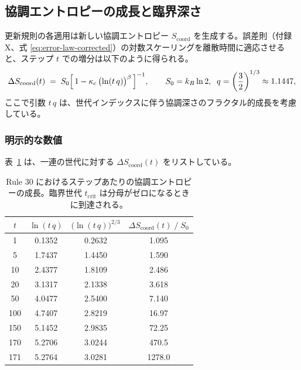 \documentclass[11pt,a4paper]{article}
\begin{document}
	\subsection{協調エントロピーの成長と臨界深さ}
	\label{subsec:entropy-growth}
	
	更新規則の各適用は新しい協調エントロピー \(S_{\mathrm{coord}}\) を生成する。誤差則（付録 X、式 \eqref{eq:error-law-corrected}）の対数スケーリングを離散時間に適応させると、ステップ \(t\) での増分は以下のように得られる。
	\begin{equation}
		\Delta S_{\mathrm{coord}}(t) \;=\;
		S_{0}\Bigl[\,1 - \kappa_c\,\bigl(\ln(t\,q)\bigr)^{\beta}\,\Bigr]^{-1},
		\qquad
		S_{0}=k_{B}\ln 2,\;\;
		q = \left(\frac{3}{2}\right)^{1/3}\approx 1.1447,
		\label{eq:deltaS}
	\end{equation}
	ここで引数 \(t\,q\) は、世代インデックスに伴う協調深さのフラクタル的成長を考慮している。
	
	\subsubsection*{明示的な数値}
	表~\ref{tab:entropy} は、一連の世代に対する \(\Delta S_{\mathrm{coord}}(t)\) をリストしている。
	
	\begin{table}[H]
		\centering
		\caption{Rule 30 におけるステップあたりの協調エントロピーの成長。臨界世代 \(t_{\mathrm{crit}}\) は分母がゼロになるときに到達される。}
		\label{tab:entropy}
		\small
		\begin{tabular}{c c c c}
			\toprule
			\(t\) & \(\ln(t\,q)\) & \(\bigl(\ln(t\,q)\bigr)^{2/3}\) &
			\(\Delta S_{\mathrm{coord}}(t)\;/\;S_{0}\) \\
			\midrule
			1    & 0.1352 & 0.2632 & 1.095  \\
			5    & 1.7437 & 1.4450 & 1.590  \\
			10   & 2.4377 & 1.8109 & 2.486  \\
			20   & 3.1317 & 2.1338 & 3.618  \\
			50   & 4.0477 & 2.5400 & 7.140  \\
			100  & 4.7407 & 2.8219 & 16.97  \\
			150  & 5.1452 & 2.9835 & 72.25  \\
			170  & 5.2706 & 3.0244 & 470.5  \\
			171  & 5.2764 & 3.0281 & 1278.0 \\
			\bottomrule
		\end{tabular}
	\end{table}
	
\end{document}
